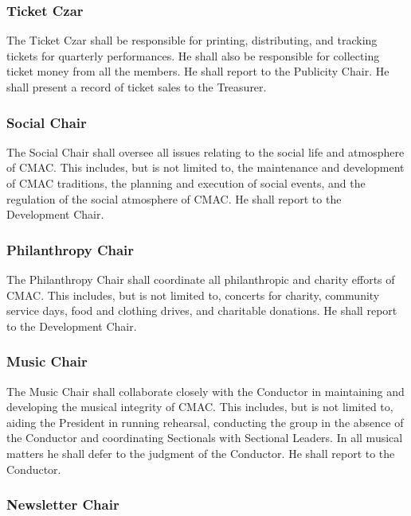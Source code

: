 \documentclass{article}
\begin{document}
\subsubsection{Ticket Czar}

The Ticket Czar shall be responsible for printing, distributing, and
tracking tickets for quarterly performances. He shall also be responsible
for collecting ticket money from all the members. He shall report
to the Publicity Chair. He shall present a record of ticket sales
to the Treasurer.


\subsubsection{Social Chair}

The Social Chair shall oversee all issues relating to the social life
and atmosphere of CMAC. This includes, but is not limited to, the
maintenance and development of CMAC traditions, the planning and execution
of social events, and the regulation of the social atmosphere of CMAC.
He shall report to the Development Chair.


\subsubsection{Philanthropy Chair}

The Philanthropy Chair shall coordinate all philanthropic and charity
efforts of CMAC. This includes, but is not limited to, concerts for
charity, community service days, food and clothing drives, and charitable
donations. He shall report to the Development Chair.


\subsubsection{Music Chair}

The Music Chair shall collaborate closely with the Conductor in maintaining
and developing the musical integrity of CMAC. This includes, but is
not limited to, aiding the President in running rehearsal, conducting
the group in the absence of the Conductor and coordinating Sectionals
with Sectional Leaders. In all musical matters he shall defer to the
judgment of the Conductor. He shall report to the Conductor.


\subsubsection{Newsletter Chair}
\end{document}
